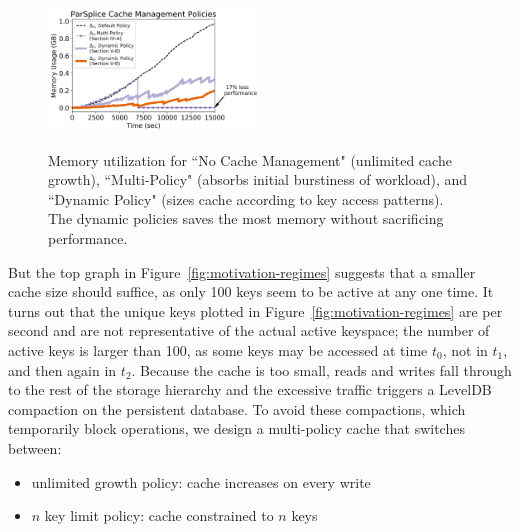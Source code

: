 \begin{figure}[t]
        \centering
        \includegraphics[width=0.5\textwidth]{./chapters/controlplane/parsplice/figures/memory-vs-time.png}\\
	\caption{Memory utilization for ``No Cache Management" (unlimited cache
growth), ``Multi-Policy" (absorbs initial burstiness of workload), and
``Dynamic Policy" (sizes cache according to key access patterns). The dynamic
policies saves the most memory without sacrificing performance.
\label{fig:memory-vs-time}}
\end{figure}%
 


%
%

But the top graph in Figure~\ref{fig:motivation-regimes} suggests that a
smaller cache size should suffice, as only 100 keys seem to be active at any
one time.  It turns out that the unique keys plotted in
Figure~\ref{fig:motivation-regimes} are per second and are not representative
of the actual active keyspace; the number of active keys is larger than 100, as
some keys may be accessed at time \(t_0\), not in \(t_1\), and then again in
\(t_2\). Because the cache is too small, reads and writes fall through to the
rest of the storage hierarchy and the excessive traffic triggers a LevelDB
compaction on the persistent database.  To avoid these compactions, which
temporarily block operations, we design a multi-policy cache that switches
between:

\begin{itemize}
  \item unlimited growth policy: cache increases on every write
  \item \(n\) key limit policy: cache constrained to \(n\) keys
\end{itemize}

